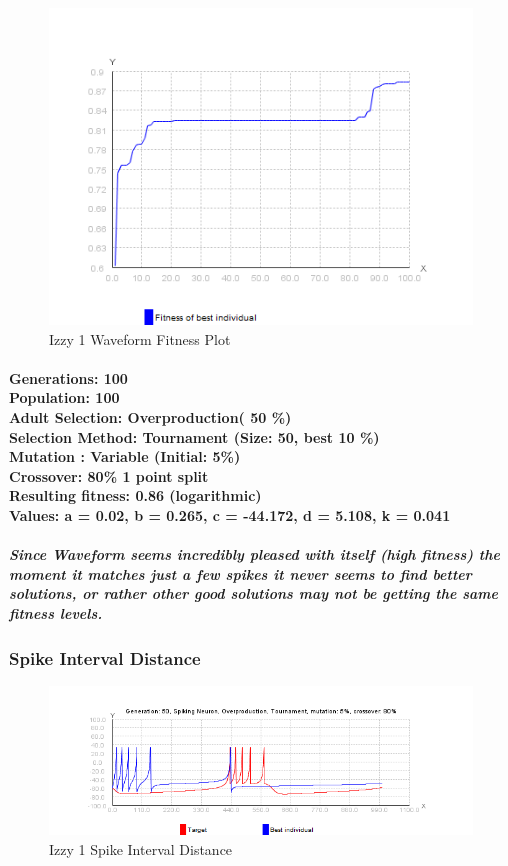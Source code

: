 \documentclass[titlepage,norsk]{article}
\begin{document}
\begin{figure}[h!]
\centering
\includegraphics[scale=0.75]{izzy1waveFitness.png}
\caption{Izzy 1 Waveform Fitness Plot}
\label{fig:awesome_image}
\end{figure}

\paragraph{
Generations: 100\\
Population: 100\\
Adult Selection: Overproduction( 50 \%)\\
Selection Method: Tournament (Size: 50, best 10 \%) \\
Mutation : Variable (Initial: 5\%)\\
Crossover: 80\% 1 point split \\
Resulting fitness: 0.86 (logarithmic) \\
Values: a = 0.02, b = 0.265, c = -44.172, d = 5.108, k = 0.041 \\
}

\subparagraph{Since Waveform seems incredibly pleased with itself (high fitness) the moment it matches just a few spikes it never seems to find better solutions, or rather other good solutions may not be getting the same fitness levels.}

\subsubsection{Spike Interval Distance}

\begin{figure}[h!]
\centering
\includegraphics[scale=0.75]{izzy1interval.png}
\caption{Izzy 1 Spike Interval Distance}
\label{fig:awesome_image}
\end{figure}
\end{document}
